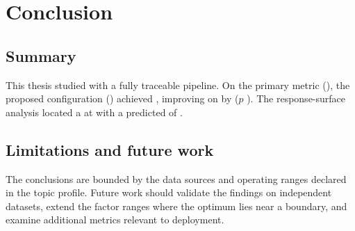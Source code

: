 \chapter{Conclusion}
\label{chap:conclusion}

\section{Summary}
This thesis studied \ThesisTitle{} with a fully traceable pipeline. On the primary metric
(\MetricPrimaryName), the proposed configuration (\MetricPrimaryProposedName) achieved
\MetricPrimaryProposedMean{} \MetricPrimaryUnit, improving on \MetricPrimaryRunnerUpName{} by
\DiffPrimaryAbs{} ($p$ \StatPrimaryPval).
\ifAutoHasRsm
The response-surface analysis located a \StatRsmPrimaryOptNature{} at \StatRsmPrimaryOptPoint{} with a
predicted \MetricPrimaryName{} of \StatRsmPrimaryOptResponse.
\fi

\section{Limitations and future work}
The conclusions are bounded by the data sources and operating ranges declared in the topic
profile. Future work should validate the findings on independent datasets, extend the factor
ranges where the optimum lies near a boundary, and examine additional metrics relevant to
deployment.
